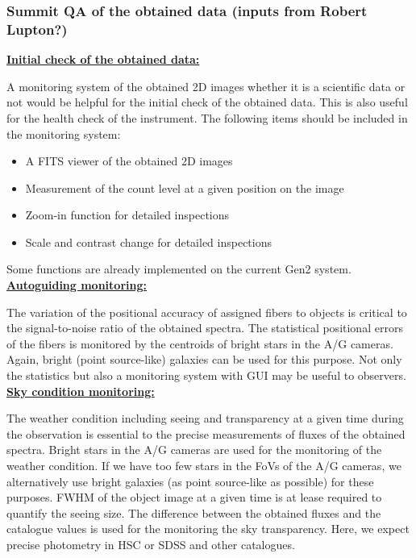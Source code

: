 \documentclass[a4paper]{article}
\begin{document}
\subsubsection{Summit QA of the obtained data (inputs from Robert Lupton?)}
\noindent \underline{\textbf{Initial check of the obtained data:}}
\vspace{5pt}

A monitoring system of the obtained 2D images whether it is a scientific data or not would be helpful for the initial check of the obtained data. This is also useful for the health check of the instrument. The following items should be included in the monitoring system:\\

\begin{itemize}
\item A FITS viewer of the obtained 2D images
\item Measurement of the count level at a given position on the image
\item Zoom-in function for detailed inspections
\item Scale and contrast change for detailed inspections
\end{itemize}

Some functions are already implemented on the current Gen2 system.\\

\noindent \underline{\textbf{Autoguiding monitoring:}}
\vspace{5pt}

The variation of the positional accuracy of assigned fibers to objects is critical to the signal-to-noise ratio of the obtained spectra. The statistical positional errors of the fibers is monitored by the centroids of bright stars in the A/G cameras. Again, bright (point source-like) galaxies can be used for this purpose. Not only the statistics but also a monitoring system with GUI may be useful to observers.\\

\noindent \underline{\textbf{Sky condition monitoring:}}
\vspace{5pt}

The weather condition including seeing and transparency at a given time during the observation is essential to the precise measurements of fluxes of the obtained spectra. Bright stars in the A/G cameras are used for the monitoring of the weather condition. If we have too few stars in the FoVs of the A/G cameras, we alternatively use bright galaxies (as point source-like as possible) for these purposes. FWHM of the object image at a given time is at lease required to quantify the seeing size. The difference between the obtained fluxes and the catalogue values is used for the monitoring the sky transparency. Here, we expect precise photometry in HSC or SDSS and other catalogues.
\end{document}
